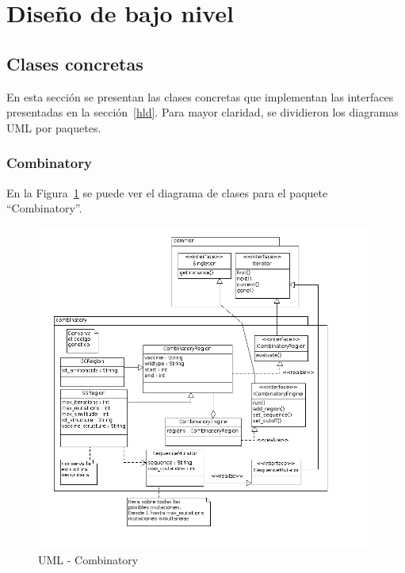 \section{Dise\~no de bajo nivel}
\label{lld}  
  \subsection{Clases concretas}
  En esta secci\'on se presentan las clases concretas que implementan las
interfaces presentadas en la secci\'on~\ref{hld}. Para mayor claridad, se
dividieron los diagramas UML por paquetes.

  \subsubsection{Combinatory}
  En la Figura~\ref{uml:lld-combinatory} se puede ver el diagrama de clases
para el paquete ``Combinatory''.
    \begin{figure}
      \centering
      \includegraphics[scale=0.5]{lld-combinatory.png}  
      \caption{UML - Combinatory}
      \label{uml:lld-combinatory}
    \end{figure}

